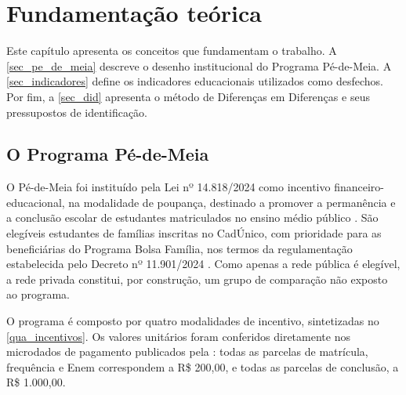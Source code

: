 
\chapter{Fundamentação teórica}
\label{chap_fundamentacao_teorica}

Este capítulo apresenta os conceitos que fundamentam o trabalho.
A \autoref{sec_pe_de_meia} descreve o desenho institucional do Programa Pé-de-Meia.
A \autoref{sec_indicadores} define os indicadores educacionais utilizados como desfechos.
Por fim, a \autoref{sec_did} apresenta o método de Diferenças em Diferenças e seus pressupostos de identificação.

\section{O Programa Pé-de-Meia}
\label{sec_pe_de_meia}

O Pé-de-Meia foi instituído pela Lei nº 14.818/2024 como incentivo financeiro-educacional, na modalidade de poupança, destinado a promover a permanência e a conclusão escolar de estudantes matriculados no ensino médio público \cite{Brasil2024Lei14818}.
São elegíveis estudantes de famílias inscritas no CadÚnico, com prioridade para as beneficiárias do Programa Bolsa Família, nos termos da regulamentação estabelecida pelo Decreto nº 11.901/2024 \cite{Brasil2024Decreto11901}.
Como apenas a rede pública é elegível, a rede privada constitui, por construção, um grupo de comparação não exposto ao programa.

O programa é composto por quatro modalidades de incentivo, sintetizadas no \autoref{qua_incentivos}.
Os valores unitários foram conferidos diretamente nos microdados de pagamento publicados pela : todas as parcelas de matrícula, frequência e Enem correspondem a R\$ 200,00, e todas as parcelas de conclusão, a R\$ 1.000,00.

